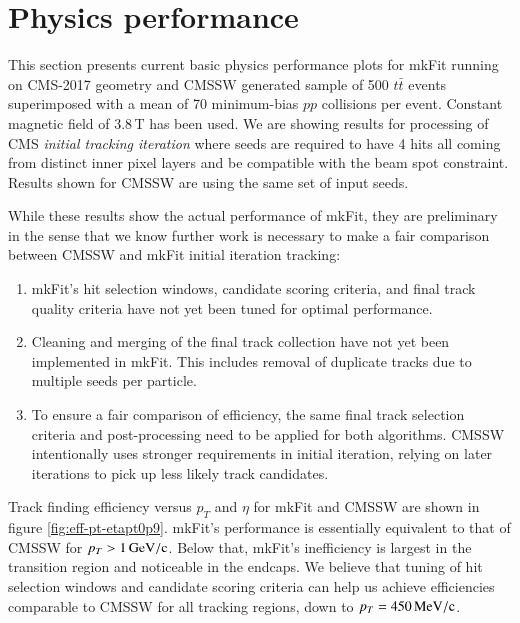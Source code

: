 \documentclass{webofc}
\def\mkfit{mkFit\xspace}
\def\MeVoc{\ensuremath{\,\rm{M}e\rm{V}/c}}
\def\GeVoc{\ensuremath{\,\rm{G}e\rm{V}/c}}
\begin{document}
\section{Physics performance}
\label{sec:phys-perf}

This section presents current basic physics performance plots for \mkfit
running on CMS-2017 geometry and CMSSW generated sample of 500 $t\bar{t}$
events superimposed with a mean of 70 minimum-bias $pp$ collisions per event.
Constant magnetic field of 3.8\,T has been used. We are showing
results for processing of CMS \emph{initial tracking iteration} where seeds are
required to have 4 hits all coming from distinct inner pixel layers and be
compatible with the beam spot constraint. Results shown for CMSSW are using
the same set of input seeds.

While these results show the actual performance of \mkfit, they are
preliminary in the sense that we know further work is necessary to make a fair
comparison between CMSSW and \mkfit initial iteration tracking:
\begin{enumerate}[--]\topsep-2pt\itemsep-2pt
\item \mkfit's hit selection windows, candidate scoring criteria, and final track
  quality criteria have not yet been tuned for optimal performance.
\item Cleaning and merging of the final track collection have not yet been
  implemented in \mkfit. This includes removal of duplicate tracks due to
  multiple seeds per particle.
\item To ensure a fair comparison of efficiency, the same final track selection
  criteria and post-processing need to be applied for both algorithms. CMSSW
  intentionally uses stronger requirements in initial iteration, relying on later
  iterations to pick up less likely track candidates.
\end{enumerate}

Track finding efficiency versus $p_T$ and $\eta$ for \mkfit and CMSSW are shown
in figure \ref{fig:eff-pt-etapt0p9}. \mkfit's performance is essentially
equivalent to that of CMSSW for $p_T > 1\GeVoc$. Below that, \mkfit's
inefficiency is largest in the transition region and noticeable in the
endcaps. We believe that tuning of hit selection windows and candidate scoring
criteria can help us achieve efficiencies comparable to CMSSW for all tracking
regions, down to $p_T = 450\MeVoc$.
\end{document}
